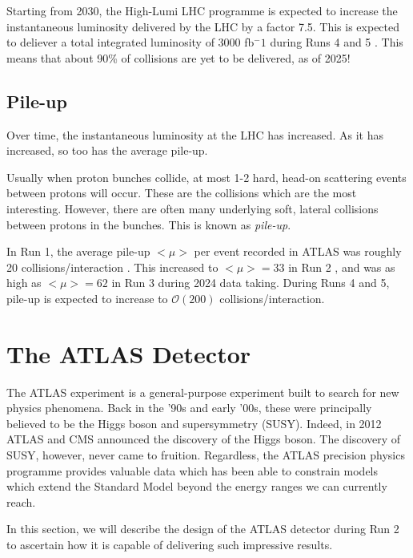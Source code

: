 \documentclass[10pt,a4paper]{book}
\begin{document}
Starting from 2030, the High-Lumi LHC programme is expected to increase the instantaneous luminosity delivered by the LHC by a factor 7.5. This is expected to deliever a total integrated luminosity of 3000 fb$^-1$ during Runs 4 and 5 \cite{ISSP}. This means that about 90\% of collisions are yet to be delivered, as of 2025!

\subsection{Pile-up}

Over time, the instantaneous luminosity at the LHC has increased. As it has increased, so too has the average pile-up.

Usually when proton bunches collide, at most 1-2 hard, head-on scattering events between protons will occur. These are the collisions which are the most interesting. However, there are often many underlying soft, lateral collisions between protons in the bunches. This is known as \emph{pile-up}.

In Run 1, the average pile-up $<\mu>$ per event recorded in ATLAS was roughly 20 collisions/interaction \cite{ATLAS:2017pfq}. This increased to $<\mu> = 33$ in Run 2 \cite{ATLAS:2023hxv}, and was as high as $<\mu> = 62$ in Run 3 during 2024 data taking. During Runs 4 and 5, pile-up is expected to increase to $\mathcal{O}(200)$ collisions/interaction.



\section{The ATLAS Detector}

The ATLAS experiment is a general-purpose experiment built to search for new physics phenomena. Back in the '90s and early '00s, these were principally believed to be the Higgs boson and supersymmetry (SUSY). Indeed, in 2012 ATLAS and CMS announced the discovery of the Higgs boson. The discovery of SUSY, however, never came to fruition. Regardless, the ATLAS precision physics programme provides valuable data which has been able to constrain models which extend the Standard Model beyond the energy ranges we can currently reach.

In this section, we will describe the design of the ATLAS detector during Run 2 to ascertain how it is capable of delivering such impressive results.
\end{document}
